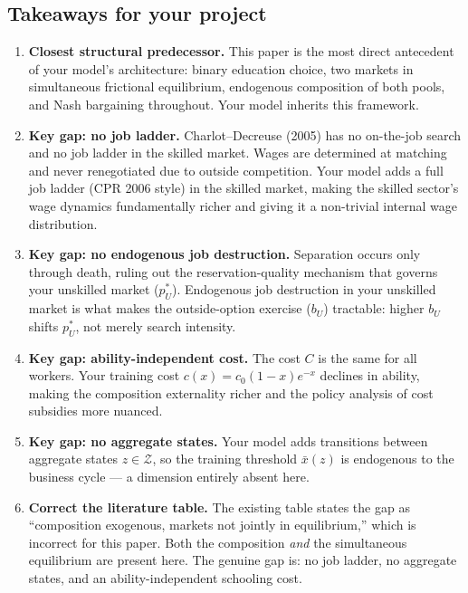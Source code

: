 \documentclass[12pt]{article}
\begin{document}
\subsection*{Takeaways for your project}

\begin{enumerate}
    \item \textbf{Closest structural predecessor.} This paper is the most direct antecedent of your model's architecture: binary education choice, two markets in simultaneous frictional equilibrium, endogenous composition of both pools, and Nash bargaining throughout. Your model inherits this framework.

    \item \textbf{Key gap: no job ladder.} Charlot--Decreuse (2005) has no on-the-job search and no job ladder in the skilled market. Wages are determined at matching and never renegotiated due to outside competition. Your model adds a full job ladder (CPR 2006 style) in the skilled market, making the skilled sector's wage dynamics fundamentally richer and giving it a non-trivial internal wage distribution.

    \item \textbf{Key gap: no endogenous job destruction.} Separation occurs only through death, ruling out the reservation-quality mechanism that governs your unskilled market ($p_U^*$). Endogenous job destruction in your unskilled market is what makes the outside-option exercise ($b_U$) tractable: higher $b_U$ shifts $p_U^*$, not merely search intensity.

    \item \textbf{Key gap: ability-independent cost.} The cost $C$ is the same for all workers. Your training cost $c(x) = c_0(1-x)e^{-x}$ declines in ability, making the composition externality richer and the policy analysis of cost subsidies more nuanced.

    \item \textbf{Key gap: no aggregate states.} Your model adds transitions between aggregate states $z \in \mathcal{Z}$, so the training threshold $\bar{x}(z)$ is endogenous to the business cycle --- a dimension entirely absent here.

    \item \textbf{Correct the literature table.} The existing table states the gap as ``composition exogenous, markets not jointly in equilibrium,'' which is incorrect for this paper. Both the composition \emph{and} the simultaneous equilibrium are present here. The genuine gap is: no job ladder, no aggregate states, and an ability-independent schooling cost.
\end{enumerate}
\end{document}

